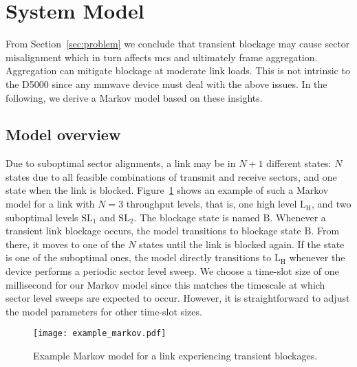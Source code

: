 \documentclass{article}
\begin{document}
\section{System Model}
\label{sec:approach}

From Section~\ref{sec:problem} we conclude that transient blockage may cause sector misalignment which in turn affects \ac{mcs} and ultimately frame aggregation. Aggregation can mitigate blockage at moderate link loads. This is not intrinsic to the D5000 since any \ac{mmwave} device must deal with the above issues. In the following, we derive a Markov model based on these insights.

\subsection{Model overview}
\label{sec:model_ovw}

Due to suboptimal sector alignments, a link may be in $N+1$ different states: $N$ states due to all feasible combinations of transmit and receive sectors, and one state when the link is blocked. Figure~\ref{fig:example_markov} shows an example of such a Markov model for a link with $N = 3$ throughput levels, that is, one high level $\text{L}_\text{H}$, and two suboptimal levels $\text{SL}_\text{1}$ and $\text{SL}_\text{2}$. The blockage state is named $\text{B}$. Whenever a transient link blockage occurs, the model transitions to blockage state $\text{B}$. From there, it moves to one of the $N$ states until the link is blocked again. If the state is one of the suboptimal ones, the model directly transitions to $\text{L}_\text{H}$ whenever the device performs a periodic sector level sweep. We choose a time-slot size of one millisecond for our Markov model since this matches the timescale at which  sector level sweeps are expected to occur. However, it is straightforward to adjust the model parameters for other time-slot sizes.

\begin{figure}
	\centering
		\texttt{[image: example\_markov.pdf]}
	\caption{Example Markov model for a link experiencing transient blockages.}
	\label{fig:example_markov}
\end{figure}
\end{document}
